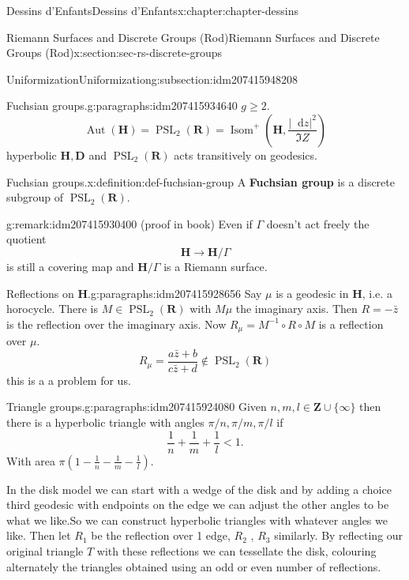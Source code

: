 \documentclass[oneside,10pt,]{book}
\newcommand{\terminology}[1]{\textbf{#1}}
\numberwithin{equation}{section}
\newcommand{\diff}{\mathop{}\!\mathrm{d}}
\newcommand{\inv}{^{-1}}
\newcommand{\ZZ}{\mathbf{Z}}
\newcommand{\RR}{\mathbf{R}}
\newcommand{\HH}{\mathbf{H}}
\DeclareMathOperator{\Aut}{Aut}
\DeclareMathOperator{\PSL}{PSL}
\newcommand{\lt}{<}
\begin{document}
\begin{chapterptx}{Dessins d'Enfants}{}{Dessins d'Enfants}{}{}{x:chapter:chapter-dessins}
\begin{sectionptx}{Riemann Surfaces and Discrete Groups (Rod)}{}{Riemann Surfaces and Discrete Groups (Rod)}{}{}{x:section:sec-rs-discrete-groups}
\begin{subsectionptx}{Uniformization}{}{Uniformization}{}{}{g:subsection:idm207415948208}
\begin{paragraphs}{Fuchsian groups.}{g:paragraphs:idm207415934640}%
\(g \ge 2\).%
\begin{equation*}
\Aut (\HH) = \PSL_2(\RR) = \operatorname{Isom}^+ ( \HH, \frac{|\diff z|^2}{\Im Z})
\end{equation*}
hyperbolic \(\HH, \mathbf D\) and \(\PSL_2(\RR)\) acts transitively on geodesics.%
\begin{definition}{Fuchsian groups.}{x:definition:def-fuchsian-group}%
A \terminology{Fuchsian group} is a discrete subgroup of \(\PSL_2(\RR)\).%
\end{definition}
\begin{remark}{}{g:remark:idm207415930400}%
(proof in book) Even if \(\Gamma\) doesn't act freely the quotient%
\begin{equation*}
\HH \to \HH/\Gamma
\end{equation*}
is still a covering map and \(\HH/\Gamma\) is a Riemann surface.%
\end{remark}
\end{paragraphs}%
\begin{paragraphs}{Reflections on \(\HH\).}{g:paragraphs:idm207415928656}%
Say \(\mu\) is a geodesic in \(\HH\), i.e. a horocycle. There is \(M \in \PSL_2(\RR)\) with \(M\mu\) the imaginary axis. Then \(R = -\bar z\) is the reflection  over the imaginary axis. Now \(R_\mu = M\inv\circ R \circ M\) is a reflection over \(\mu\).%
\begin{equation*}
R_\mu = \frac{a\bar z  + b}{ c\bar z + d}\not\in \PSL_2(\RR)
\end{equation*}
this is a a problem for us.%
\end{paragraphs}%
\begin{paragraphs}{Triangle groups.}{g:paragraphs:idm207415924080}%
Given \(n, m, l\in \ZZ \cup \{\infty\}\) then there is a hyperbolic triangle with angles \(\pi/n,\pi/m, \pi/l\) if%
\begin{equation*}
\frac 1n + \frac 1m + \frac 1l \lt 1\text{.}
\end{equation*}
With area \(\pi(1 -  \frac 1n - \frac 1m - \frac 1l)\).%
\par
In the disk model we can start with a wedge of the disk and by adding a choice third geodesic with endpoints on the edge we can adjust the other angles to be what we like.So we can construct hyperbolic triangles with whatever angles we like. Then let \(R_1\) be the reflection over 1 edge, \(R_2\) , \(R_3\) similarly. By reflecting our original triangle \(T\) with these reflections we can tessellate the disk, colouring alternately the triangles obtained using an odd or even number of reflections.%

\end{paragraphs}
\end{subsectionptx}
\end{sectionptx}
\end{chapterptx}
\end{document}
